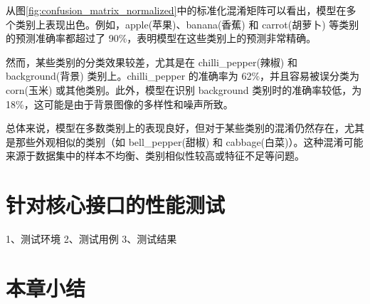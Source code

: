 从图\ref{fig:confusion_matrix_normalized}中的标准化混淆矩阵可以看出，模型在多个类别上表现出色。例如，apple(苹果)、banana(香蕉) 和 carrot(胡萝卜) 等类别的预测准确率都超过了 90\%，表明模型在这些类别上的预测非常精确。

然而，某些类别的分类效果较差，尤其是在 chilli\_pepper(辣椒) 和 background(背景) 类别上。chilli\_pepper 的准确率为 62\%，并且容易被误分类为 corn(玉米) 或其他类别。此外，模型在识别 background 类别时的准确率较低，为 18\%，这可能是由于背景图像的多样性和噪声所致。

总体来说，模型在多数类别上的表现良好，但对于某些类别的混淆仍然存在，尤其是那些外观相似的类别（如 bell\_pepper(甜椒) 和 cabbage(白菜)）。这种混淆可能来源于数据集中的样本不均衡、类别相似性较高或特征不足等问题。

\section{针对核心接口的性能测试}

1、测试环境
2、测试用例
3、测试结果

\section{本章小结}